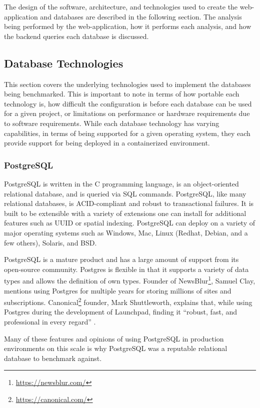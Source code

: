 The design of the software, architecture, and technologies used to create the web-application and databases are described in the following section. The analysis being performed by the web-application, how it performs each analysis, and how the backend queries each database is discussed.

\subsection{Database Technologies}

This section covers the underlying technologies used to implement the databases being benchmarked. This is important to note in terms of how portable each technology is, how difficult the configuration is before each database can be used for a given project, or limitations on performance or hardware requirements due to software requirements. While each database technology has varying capabilities, in terms of being supported for a given operating system, they each provide support for being deployed in a containerized environment.

\subsubsection{PostgreSQL}
PostgreSQL is written in the C programming language, is an object-oriented relational database, and is queried via SQL commands. PostgreSQL, like many relational databases, is ACID-compliant and robust to transactional failures. It is built to be extensible with a variety of extensions one can install for additional features such as UUID or spatial indexing. PostgreSQL can deploy on a variety of major operating systems such as Windows, Mac, Linux (Redhat, Debian, and a few others), Solaris, and BSD.

PostgreSQL is a mature product and has a large amount of support from its open-source community. Postgres is flexible in that it supports a variety of data types and allows the definition of own types. Founder of NewsBlur\footnote{\url{https://newsblur.com/}}, Samuel Clay, mentions using Postgres for multiple years for storing millions of sites and subscriptions. Canonical\footnote{\url{https://canonical.com/}} founder, Mark Shuttleworth, explains that, while using Postgres during the development of Launchpad, finding it ``robust, fast, and professional in every regard'' \cite{postgres-about}.

Many of these features and opinions of using PostgreSQL in production environments on this scale is why PostgreSQL was a reputable relational database to benchmark against.

